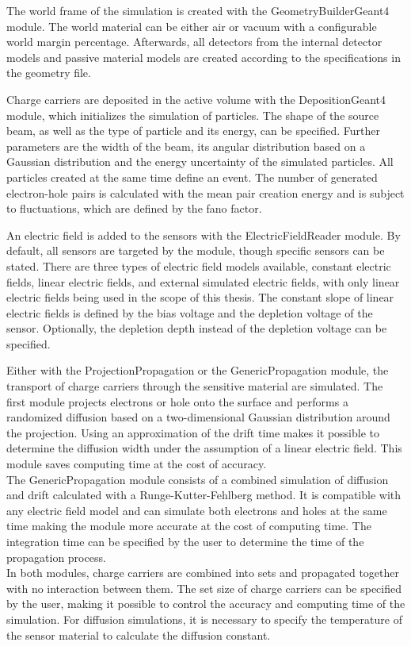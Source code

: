 The world frame of the simulation is created with the GeometryBuilderGeant4 module. The world material can be either air or vacuum with a configurable world margin percentage.
Afterwards, all detectors from the internal detector models and passive material models are created according to the specifications in the geometry file.

Charge carriers are deposited in the active volume with the DepositionGeant4 module, which initializes the simulation of particles. The shape of the source beam, as well
as the type of particle and its energy, can be specified. Further parameters are the width of the beam, its angular distribution based on a Gaussian distribution and the energy
uncertainty of the simulated particles. All particles created at the same time define an event. The number of generated electron-hole pairs is calculated with the
mean pair creation energy and is subject to fluctuations, which are defined by the fano factor.

An electric field is added to the sensors with the ElectricFieldReader module. By default, all sensors are targeted by the module, though specific sensors can be stated.
There are three types of electric field models available, constant electric fields, linear electric fields, and external simulated electric fields, with only
linear electric fields being used in the scope of this thesis. The constant slope of linear electric fields is defined by the bias voltage and the
depletion voltage of the sensor. Optionally, the depletion depth instead of the depletion voltage can be specified.

Either with the ProjectionPropagation or the GenericPropagation module, the transport of charge carriers through the sensitive material are simulated.
The first module projects electrons or hole onto the surface and performs a randomized diffusion based on a two-dimensional Gaussian distribution around
the projection. Using an approximation of the drift time makes it possible to determine the diffusion width under the assumption of a linear electric field. This
module saves computing time at the cost of accuracy. \\
The GenericPropagation module consists of a combined simulation of diffusion and drift calculated with a Runge-Kutter-Fehlberg method.
It is compatible with any electric field model and can simulate both electrons and holes
at the same time making the module
more accurate at the cost of computing time. The integration time can be specified by the user to determine the time of the propagation process. \\
In both modules, charge carriers are combined into sets and propagated together with no interaction between them. The set size of charge carriers can be specified by the user,
making it possible to control the accuracy and computing time of the simulation. For diffusion simulations, it is necessary to specify the temperature of the sensor material
to calculate the diffusion constant.

